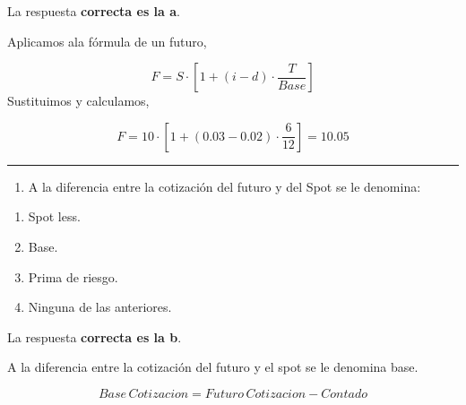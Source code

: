 \documentclass[
  letterpaper,
  DIV=11,
  numbers=noendperiod]{scrreprt}
\providecommand{\tightlist}{%
  \setlength{\itemsep}{0pt}\setlength{\parskip}{0pt}}\usepackage{longtable,booktabs,array}
\begin{document}
\begin{tcolorbox}[enhanced jigsaw, left=2mm, opacityback=0, colback=white, breakable, arc=.35mm, bottomrule=.15mm, rightrule=.15mm, toprule=.15mm, leftrule=.75mm, colframe=quarto-callout-tip-color-frame]
\begin{minipage}[t]{5.5mm}
\textcolor{quarto-callout-tip-color}{\faLightbulb}
\end{minipage}%
\begin{minipage}[t]{\textwidth - 5.5mm}

La respuesta \textbf{correcta es la a}.

Aplicamos ala fórmula de un futuro,

\[F=S\cdot\left[1+(i-d)\cdot\frac{T}{Base}\right]\] Sustituimos y
calculamos,

\[F=10\cdot\left[1+(0.03-0.02)\cdot\frac{6}{12}\right]=10.05\]

\end{minipage}%
\end{tcolorbox}

\begin{center}\rule{0.5\linewidth}{0.5pt}\end{center}

\begin{enumerate}
\def\labelenumi{\arabic{enumi}.}
\setcounter{enumi}{6}
\tightlist
\item
  A la diferencia entre la cotización del futuro y del Spot se le
  denomina:
\end{enumerate}

\begin{enumerate}
\def\labelenumi{\alph{enumi})}
\item
  Spot less.
\item
  Base.
\item
  Prima de riesgo.
\item
  Ninguna de las anteriores.
\end{enumerate}

\begin{tcolorbox}[enhanced jigsaw, left=2mm, opacityback=0, colback=white, breakable, arc=.35mm, bottomrule=.15mm, rightrule=.15mm, toprule=.15mm, leftrule=.75mm, colframe=quarto-callout-tip-color-frame]
\begin{minipage}[t]{5.5mm}
\textcolor{quarto-callout-tip-color}{\faLightbulb}
\end{minipage}%
\begin{minipage}[t]{\textwidth - 5.5mm}

La respuesta \textbf{correcta es la b}.

A la diferencia entre la cotización del futuro y el spot se le denomina
base.

\[Base\, Cotizacion= Futuro\,Cotizacion - Contado\]

\end{minipage}%
\end{tcolorbox}
\end{document}
